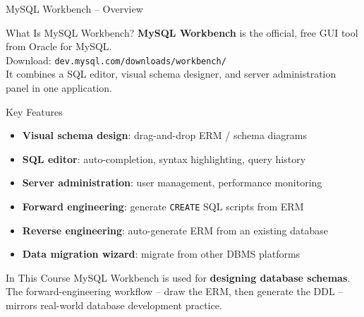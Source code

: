 \begin{frame}{MySQL Workbench -- Overview}
  \begin{block}{What Is MySQL Workbench?}
    \textbf{MySQL Workbench} is the official, free GUI tool from Oracle for MySQL.\\
    Download: \texttt{dev.mysql.com/downloads/workbench/}\\[0.3em]
    It combines a SQL editor, visual schema designer, and server administration
    panel in one application.
  \end{block}

  \begin{block}{Key Features}
    \begin{itemize}
      \item \textbf{Visual schema design}: drag-and-drop ERM / schema diagrams
      \item \textbf{SQL editor}: auto-completion, syntax highlighting, query history
      \item \textbf{Server administration}: user management, performance monitoring
      \item \textbf{Forward engineering}: generate \texttt{CREATE} SQL scripts from ERM
      \item \textbf{Reverse engineering}: auto-generate ERM from an existing database
      \item \textbf{Data migration wizard}: migrate from other DBMS platforms
    \end{itemize}
  \end{block}

  \begin{examples}{In This Course}
    MySQL Workbench is used for \textbf{designing database schemas}. The
    forward-engineering workflow -- draw the ERM, then generate the DDL --
    mirrors real-world database development practice.
  \end{examples}
\end{frame}

